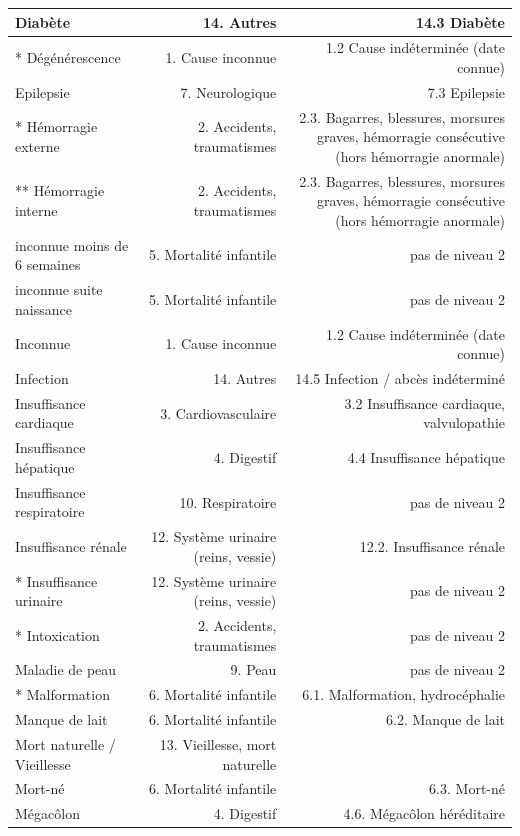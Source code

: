 ﻿\documentclass[a4paper,10pt]{article}
\begin{document}
\begin{tabularx}{\textwidth}{|l|R|R|}\hline
Diabète & 14. Autres & 14.3 Diabète\\\hline
* Dégénérescence & 1. Cause inconnue & 1.2 Cause indéterminée (date connue)\\\hline
Epilepsie & 7. Neurologique & 7.3 Epilepsie\\\hline
* Hémorragie externe & 2. Accidents, traumatismes & 2.3. Bagarres, blessures, morsures graves, hémorragie consécutive (hors hémorragie anormale)\\\hline
** Hémorragie interne & 2. Accidents, traumatismes & 2.3. Bagarres, blessures, morsures graves, hémorragie consécutive (hors hémorragie anormale)\\\hline
inconnue moins de 6 semaines & 5. Mortalité infantile & pas de niveau 2\\\hline
inconnue suite naissance & 5. Mortalité infantile & pas de niveau 2\\\hline
Inconnue & 1. Cause inconnue & 1.2 Cause indéterminée (date connue)\\\hline
Infection & 14. Autres & 14.5 Infection / abcès indéterminé\\\hline
Insuffisance cardiaque & 3. Cardiovasculaire & 3.2 Insuffisance cardiaque, valvulopathie\\\hline
Insuffisance hépatique & 4. Digestif & 4.4 Insuffisance hépatique\\\hline
Insuffisance respiratoire & 10. Respiratoire & pas de niveau 2\\\hline
Insuffisance rénale & 12. Système urinaire (reins, vessie) & 12.2. Insuffisance rénale\\\hline
* Insuffisance urinaire & 12. Système urinaire (reins, vessie) & pas de niveau 2\\\hline
* Intoxication & 2. Accidents, traumatismes & pas de niveau 2\\\hline
Maladie de peau & 9. Peau & pas de niveau 2\\\hline
* Malformation & 6. Mortalité infantile & 6.1. Malformation, hydrocéphalie\\\hline
Manque de lait & 6. Mortalité infantile & 6.2. Manque de lait\\\hline
Mort naturelle / Vieillesse & 13. Vieillesse, mort naturelle &\\\hline
Mort-né & 6. Mortalité infantile & 6.3. Mort-né\\\hline
Mégacôlon & 4. Digestif & 4.6. Mégacôlon héréditaire\\\hline

\end{tabularx}
\end{document}
